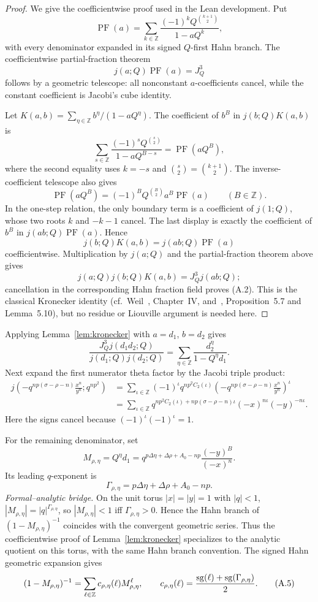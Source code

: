 \begin{proof}
We give the coefficientwise proof used in the Lean development.  Put
\[
  \operatorname{PF}(a)=
  \sum_{k\in\mathbb Z}
    \frac{(-1)^kQ^{\binom{k+1}{2}}}{1-aQ^k},
\]
with every denominator expanded in its signed $Q$-first Hahn branch.
The coefficientwise partial-fraction theorem
\[
  j(a;Q)\operatorname{PF}(a)=J_Q^3
\]
follows by a geometric telescope: all nonconstant $a$-coefficients cancel,
while the constant coefficient is Jacobi's cube identity.

Let $K(a,b)=\sum_{\eta\in\mathbb Z}b^\eta/(1-aQ^\eta)$.
The coefficient of $b^B$ in $j(b;Q)K(a,b)$ is
\[
  \sum_{s\in\mathbb Z}
    \frac{(-1)^sQ^{\binom{s}{2}}}{1-aQ^{B-s}}
  =\operatorname{PF}(aQ^B),
\]
where the second equality uses $k=-s$ and
$\binom{s}{2}=\binom{k+1}{2}$.  The inverse-coefficient telescope also gives
\[
  \operatorname{PF}(aQ^B)
  =(-1)^BQ^{\binom{B}{2}}a^B\operatorname{PF}(a)
  \qquad(B\in\mathbb Z).
\]
In the one-step relation, the only boundary term is a coefficient of
$j(1;Q)$, whose two roots $k$ and $-k-1$ cancel.  The last display is exactly
the coefficient of $b^B$ in $j(ab;Q)\operatorname{PF}(a)$.  Hence
\[
  j(b;Q)K(a,b)=j(ab;Q)\operatorname{PF}(a)
\]
coefficientwise.  Multiplication by $j(a;Q)$ and the partial-fraction theorem
above gives
\[
  j(a;Q)j(b;Q)K(a,b)=J_Q^3j(ab;Q);
\]
cancellation in the
corresponding Hahn fraction field proves (A.2).  This is the classical
Kronecker identity (cf.~Weil~\cite{oWe76}, Chapter~IV,
and~\cite{jHiMo14}, Proposition~5.7 and Lemma~5.10), but no residue or
Liouville argument is needed here.
\end{proof}
Applying Lemma~\ref{lem:kronecker} with $a=d_1$, $b=d_2$ gives
\[
  \frac{J_Q^3j(d_1d_2;Q)}{j(d_1;Q)j(d_2;Q)}
  =\sum_{\eta\in\mathbb Z}\frac{d_2^\eta}{1-Q^\eta d_1}.
\tag{A.3}
\]
Next expand the first numerator theta factor by the Jacobi triple product:
\[
\begin{aligned}
 j\!\left(-q^{np(\sigma-\rho-n)}\frac{x^n}{y^n};q^{np^2}\right)
 &=\sum_{\iota\in\mathbb Z}
 (-1)^\iota q^{np^2 C_2(\iota)}
 \left(-q^{np(\sigma-\rho-n)}\frac{x^n}{y^n}\right)^\iota \\
 &=\sum_{\iota\in\mathbb Z}
 q^{np^2 C_2(\iota)+np(\sigma-\rho-n)\iota}
 (-x)^{n\iota}(-y)^{-n\iota}.
\end{aligned}
\tag{A.4}
\]
Here the signs cancel because \((-1)^\iota(-1)^\iota=1\).

For the remaining denominator, set
\[
  M_{\rho,\eta}=Q^\eta d_1
  =q^{p\Delta\eta+\Delta\rho+A_0-np}\frac{(-y)^B}{(-x)^n}.
\]
Its leading \(q\)-exponent is
\[
  \Gamma_{\rho,\eta}=p\Delta\eta+\Delta\rho+A_0-np.
\]
\emph{Formal--analytic bridge.}
On the unit torus $|x|=|y|=1$ with $|q|<1$,
$|M_{\rho,\eta}|=|q|^{\Gamma_{\rho,\eta}}$, so
$|M_{\rho,\eta}|<1$ iff $\Gamma_{\rho,\eta}>0$.
Hence the Hahn branch of $(1-M_{\rho,\eta})^{-1}$
coincides with the convergent geometric series.  Thus the coefficientwise
proof of Lemma~\ref{lem:kronecker} specializes to the analytic quotient on
this torus, with the same Hahn branch convention.
The signed Hahn geometric expansion gives
\[
  (1-M_{\rho,\eta})^{-1}
  =\sum_{\ell\in\mathbb Z} c_{\rho,\eta}(\ell)M_{\rho,\eta}^{\ell},\qquad
  c_{\rho,\eta}(\ell)=\frac{\operatorname{sg}(\ell)+\operatorname{sg}(\Gamma_{\rho,\eta})}{2}.
\tag{A.5}
\]

